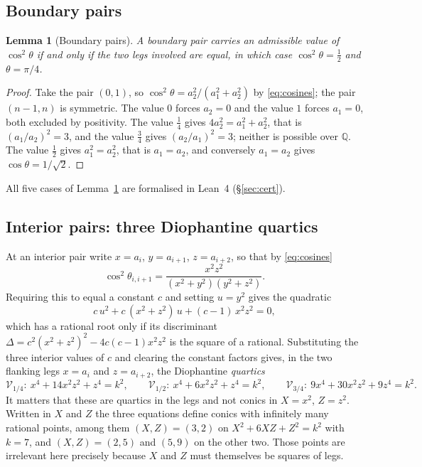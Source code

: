 \documentclass[11pt,a4paper]{article}
\newcommand{\Q}{\mathbb{Q}}
\newtheorem{lemma}[theorem]{Lemma}
\theoremstyle{definition}
\theoremstyle{remark}
\theoremstyle{plain}
\begin{document}
\subsection{Boundary pairs}

\begin{lemma}[Boundary pairs]\label{lem:boundary}
A boundary pair carries an admissible value of $\cos^2\theta$ if and only if the two legs
involved are equal, in which case $\cos^2\theta=\tfrac12$ and $\theta=\pi/4$.
\end{lemma}

\begin{proof}
Take the pair $(0,1)$, so $\cos^2\theta=a_2^2/(a_1^2+a_2^2)$ by \eqref{eq:cosines}; the pair
$(n-1,n)$ is symmetric. The value $0$ forces $a_2=0$ and the value $1$ forces $a_1=0$, both
excluded by positivity. The value $\tfrac14$ gives $4a_2^2=a_1^2+a_2^2$, that is
$(a_1/a_2)^2=3$, and the value $\tfrac34$ gives $(a_2/a_1)^2=3$; neither is possible over $\Q$.
The value $\tfrac12$ gives $a_1^2=a_2^2$, that is $a_1=a_2$, and conversely $a_1=a_2$ gives
$\cos\theta=1/\sqrt2$.
\end{proof}

All five cases of Lemma~\ref{lem:boundary} are formalised in Lean~4 (\S\ref{sec:cert}).

\subsection{Interior pairs: three Diophantine quartics}

At an interior pair write $x=a_i$, $y=a_{i+1}$, $z=a_{i+2}$, so that by \eqref{eq:cosines}
\[
\cos^2\theta_{i,i+1}=\frac{x^2z^2}{(x^2+y^2)(y^2+z^2)} .
\]
Requiring this to equal a constant $c$ and setting $u=y^2$ gives the quadratic
\begin{equation}\label{eq:uquad}
c\,u^2+c\,(x^2+z^2)\,u+(c-1)\,x^2z^2=0 ,
\end{equation}
which has a rational root only if its discriminant
$\Delta=c^2(x^2+z^2)^2-4c(c-1)x^2z^2$ is the square of a rational. Substituting the three
interior values of $c$ and clearing the constant factors gives, in the two flanking legs
$x=a_i$ and $z=a_{i+2}$, the Diophantine \emph{quartics}
\[
\mathcal{V}_{1/4}:\ x^4+14x^2z^2+z^4=k^2,\qquad
\mathcal{V}_{1/2}:\ x^4+6x^2z^2+z^4=k^2,\qquad
\mathcal{V}_{3/4}:\ 9x^4+30x^2z^2+9z^4=k^2 .
\]
It matters that these are quartics in the legs and not conics in $X=x^2$, $Z=z^2$. Written in
$X$ and $Z$ the three equations define conics with infinitely many rational points, among them
$(X,Z)=(3,2)$ on $X^2+6XZ+Z^2=k^2$ with $k=7$, and $(X,Z)=(2,5)$ and $(5,9)$ on the other two.
Those points are irrelevant here precisely because $X$ and $Z$ must themselves be squares of
legs.
\end{document}
